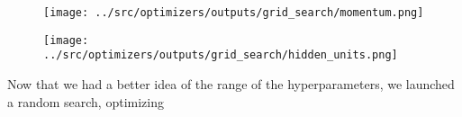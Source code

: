 \begin{figure}[!ht]
  \centering
      {{\texttt{[image: ../src/optimizers/outputs/grid\_search/momentum.png]}}}
\end{figure}

\begin{figure}[!ht]
  \centering
      {{\texttt{[image: ../src/optimizers/outputs/grid\_search/hidden\_units.png]}}}
\end{figure}


Now that we had a better idea of the range of the hyperparameters, we launched a random search, optimizing

